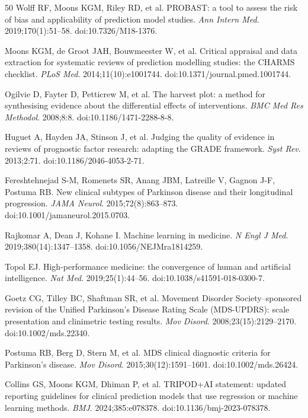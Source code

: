 \documentclass[11pt,a4paper]{article}
\begin{document}
\begin{thebibliography}{50}
Wolff RF, Moons KGM, Riley RD, et al.
PROBAST: a tool to assess the risk of bias and applicability of prediction model studies.
\textit{Ann Intern Med}. 2019;170(1):51--58.
doi:10.7326/M18-1376.

Moons KGM, de Groot JAH, Bouwmeester W, et al.
Critical appraisal and data extraction for systematic reviews of prediction modelling studies: the CHARMS checklist.
\textit{PLoS Med}. 2014;11(10):e1001744.
doi:10.1371/journal.pmed.1001744.

Ogilvie D, Fayter D, Petticrew M, et al.
The harvest plot: a method for synthesising evidence about the differential effects of interventions.
\textit{BMC Med Res Methodol}. 2008;8:8.
doi:10.1186/1471-2288-8-8.

Huguet A, Hayden JA, Stinson J, et al.
Judging the quality of evidence in reviews of prognostic factor research: adapting the GRADE framework.
\textit{Syst Rev}. 2013;2:71.
doi:10.1186/2046-4053-2-71.

Fereshtehnejad S-M, Romenets SR, Anang JBM, Latreille V, Gagnon J-F, Postuma RB.
New clinical subtypes of Parkinson disease and their longitudinal progression.
\textit{JAMA Neurol}. 2015;72(8):863--873.
doi:10.1001/jamaneurol.2015.0703.

Rajkomar A, Dean J, Kohane I.
Machine learning in medicine.
\textit{N Engl J Med}. 2019;380(14):1347--1358.
doi:10.1056/NEJMra1814259.

Topol EJ.
High-performance medicine: the convergence of human and artificial intelligence.
\textit{Nat Med}. 2019;25(1):44--56.
doi:10.1038/s41591-018-0300-7.

Goetz CG, Tilley BC, Shaftman SR, et al.
Movement Disorder Society--sponsored revision of the Unified Parkinson's Disease Rating Scale (MDS-UPDRS): scale presentation and clinimetric testing results.
\textit{Mov Disord}. 2008;23(15):2129--2170.
doi:10.1002/mds.22340.

Postuma RB, Berg D, Stern M, et al.
MDS clinical diagnostic criteria for Parkinson's disease.
\textit{Mov Disord}. 2015;30(12):1591--1601.
doi:10.1002/mds.26424.

Collins GS, Moons KGM, Dhiman P, et al.
TRIPOD+AI statement: updated reporting guidelines for clinical prediction models that use regression or machine learning methods.
\textit{BMJ}. 2024;385:e078378.
doi:10.1136/bmj-2023-078378.


\end{thebibliography}
\end{document}
